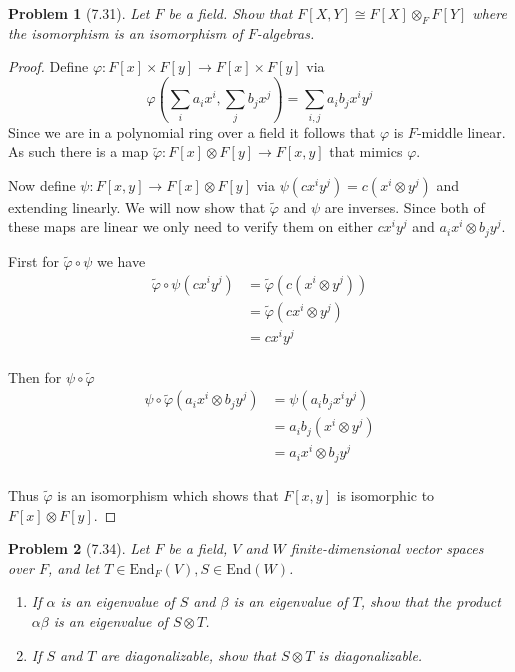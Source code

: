 \documentclass[10pt]{article}
\newcommand{\sk}{\vskip 10mm}
\newcommand{\wt}[1]{\widetilde{#1}}
\theoremstyle{plain}
\newtheorem{problem}{Problem}
\theoremstyle{remark}
\begin{document}
\sk


\begin{problem}[7.31]
  Let $F$ be a field. Show that $F[X,Y]\cong F[X]\otimes_F F[Y]$ where the
  isomorphism is an isomorphism of $F$-algebras.
\end{problem}

\begin{proof}
  Define $\varphi:F[x]\times F[y]\rightarrow F[x]\times F[y]$ via
  \[
    \varphi(\sum_i a_i x^i,\sum_j b_j x^j) = \sum_{i,j}a_i b_j x^i y^j
  \]
  Since we are in a polynomial ring over a field it follows that
  $\varphi$ is $F$-middle linear. As such there is a map
  $\wt{\varphi}:F[x]\otimes F[y]\rightarrow F[x,y]$ that mimics $\varphi$.

  Now define $\psi:F[x,y]\rightarrow F[x]\otimes F[y]$ via $\psi(cx^i y^j)=c(x^i\otimes y^j)$ and
  extending linearly. We will now show that $\wt{\varphi}$ and $\psi$ are
  inverses. Since both of these maps are linear we only need to
  verify them on either $cx^i y^j$ and $a_i x^i\otimes b_j y^j$.

  First for $\wt{\varphi}\circ \psi$ we have
  \begin{align*}
    \wt{\varphi}\circ\psi(cx^i y^j) &= \wt{\varphi}(c(x^i\otimes y^j))\\
                     &= \wt{\varphi}(cx^i\otimes y^j)\\
                     &= cx^i y^j\\
  \end{align*}

  Then for $\psi\circ\wt{\varphi}$
  \begin{align*}
    \psi\circ\wt{\varphi}(a_i x^i \otimes b_j y^j) &= \psi (a_i b_j x^i y^j)\\
                             &= a_i b_j (x^i\otimes y^j)\\
                             &= a_i x^i \otimes b_j y^j\\
  \end{align*}

  Thus $\wt{\varphi}$ is an isomorphism which shows that $F[x,y]$ is isomorphic
  to $F[x]\otimes F[y]$.
\end{proof}

\sk

\begin{problem}[7.34]
  Let $F$ be a field, $V$ and $W$ finite-dimensional vector spaces over $F$,
  and let $T\in\text{End}_F(V),S\in\text{End}(W)$.
  \begin{enumerate}
  \item[(a)] If $\alpha$ is an eigenvalue of $S$ and $\beta$ is an eigenvalue of
    $T$, show that the product $\alpha\beta$ is an eigenvalue of $S\otimes T$.
  \item[(b)] If $S$ and $T$ are diagonalizable, show that $S\otimes T$
    is diagonalizable.
  \end{enumerate}
\end{problem}
\end{document}
